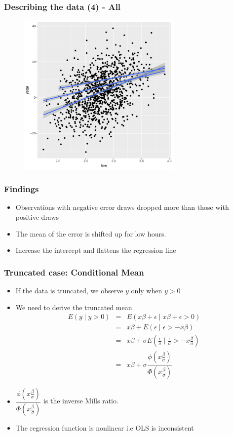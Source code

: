 \documentclass{beamer}
\newcommand{\1}{\mathbb{1}}
\begin{document}
\begin{frame}\frametitle{Describing the data (4) - All}
\begin{figure}
\includegraphics[width = 8cm]{plot/scatter4}
\end{figure}
\end{frame}

\begin{frame}\frametitle{Findings}
\begin{itemize}
 \item Observations with negative error draws dropped more than those with positive draws
 \item The mean of the error is shifted up for low hours.
 \item Increase the intercept and flattens the regression line
\end{itemize}
\end{frame}

\begin{frame}\frametitle{Truncated case: Conditional Mean}
\begin{itemize}
 \item If the data is truncated, we observe $y$ only when $y>0$
 \item We need to derive the truncated mean
 \begin{eqnarray*}
 E(y \mid y>0) &=& E(x\beta + \epsilon \mid x\beta + \epsilon >0 ) \\
 &=& x\beta + E( \epsilon \mid  \epsilon > -x\beta ) \\
 &=& x\beta + \sigma E( \tfrac{\epsilon}{\sigma} \mid  \tfrac{\epsilon}{\sigma} > -x\tfrac{\beta}{\sigma} ) \\
  &=& x\beta + \sigma \dfrac{\phi(x\tfrac{\beta}{\sigma})}{\Phi(x\tfrac{\beta}{\sigma})}
  \end{eqnarray*}
\item $\dfrac{\phi(x\tfrac{\beta}{\sigma})}{\Phi(x\tfrac{\beta}{\sigma})}$ is the inverse Mills ratio.
\item The regression function is nonlinear i.e OLS is inconsistent
\end{itemize}
\end{frame}
\end{document}

